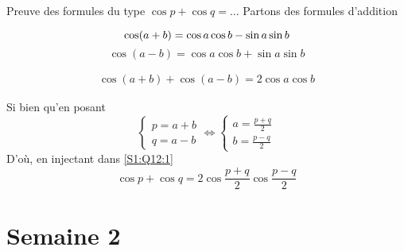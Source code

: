 \documentclass{article}
\renewenvironment{question_kholle}[2][ ]
{
	\subsection{\texorpdfstring{#2}{}}
	\notblank{#1}
	{
		\noindent #1
		\bigbreak
	}
	{}
	\begin{proof}
}
{
	\end{proof}
}
\begin{document}
\begin{question_kholle}{Preuve des formules du type $\cos p + \cos q = \dots$}
  Partons des formules d'addition

  $$
    \cos (a+b) = \cos a\cos b-\sin a\sin b\\
  $$
  $$
    \cos (a-b) = \cos a\cos b+\sin a\sin b
  $$

  \begin{align*}
    \cos(a+b) + \cos (a-b) = 2\cos a\cos b
    \tag{$\spadesuit$}\label{S1:Q12:1}
  \end{align*}


  Si bien qu'en posant
  $$
    \left\{ \begin{array}{ll}
      p = a+b \\
      q= a-b
    \end{array}\right.
    \iff
    \left\{ \begin{array}{ll}
      a = \frac{p+q}{2} \\
      b= \frac{p-q}{2}
    \end{array}\right.
  $$
  D'où, en injectant dans \eqref{S1:Q12:1}
  $$
    \cos p + \cos q = 2\cos \frac{p+q}{2} \cos \frac{p-q}{2}
  $$

\end{question_kholle}
\pagebreak\section{Semaine 2}
\end{document}
